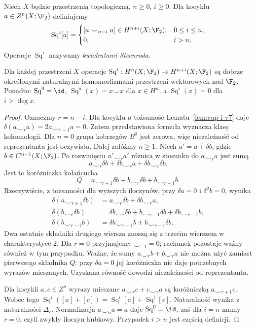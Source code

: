 \begin{definicja}
Niech $X$ będzie przestrzenią topologiczną,
$n\ge0$, $i\ge0$. Dla kocyklu
$a\in Z^n(X;\F_2)$ definiujemy
\[
\operatorname{Sq}^i[a]=
\begin{cases}
[a\smile_{n-i}a]\in H^{n+i}(X;\F_2),&0\le i\le n,\\
0,&i>n.
\end{cases}
\]
Operacje $\operatorname{Sq}^i$ nazywamy
\emph{kwadratami Steenroda}.
\end{definicja}

\begin{twierdzenie}
\label{thm:steenrod-basic-v7}
Dla każdej przestrzeni $X$ operacje
$\operatorname{Sq}^i:H^n(X;\F_2)\to H^{n+i}(X;\F_2)$
są dobrze określonymi naturalnymi homomorfizmami
przestrzeni wektorowych nad $\F_2$. Ponadto:
$\operatorname{Sq}^0=\id$,
$\operatorname{Sq}^n(x)=x\smile x$ dla $x\in H^n$,
a $\operatorname{Sq}^i(x)=0$ dla $i>\deg x$.
\end{twierdzenie}
\begin{proof}
Oznaczmy $r=n-i$. Dla kocyklu $a$ tożsamość
Lematu~\ref{lem:cup-i-v7} daje
$\delta(a\smile_r a)=2a\smile_{r-1}a=0$.
Zatem przedstawiona formuła wyznacza klasę
kohomologii. Dla $n=0$ grupa kobrzegów $B^0$ jest zerowa,
więc niezależność od reprezentanta jest oczywista.
Dalej załóżmy $n\ge1$. Niech $a'=a+\delta b$, gdzie
$b\in C^{n-1}(X;\F_2)$. Po rozwinięciu
$a'\smile_r a'$ różnica w stosunku do
$a\smile_r a$ jest sumą
\[
a\smile_r\delta b+\delta b\smile_r a
+\delta b\smile_r\delta b.
\]
Jest to koróżniczka kołańcucha
\[
Q=a\smile_{r+1}\delta b
  +b\smile_r\delta b+b\smile_{r-1}b.
\]
Rzeczywiście, z tożsamości dla wyższych iloczynów,
przy $\delta a=0$ i $\delta^2b=0$, wynika
\[
\begin{aligned}
\delta(a\smile_{r+1}\delta b)
 &=a\smile_r\delta b+\delta b\smile_r a,\\
\delta(b\smile_r\delta b)
 &=\delta b\smile_r\delta b
   +b\smile_{r-1}\delta b+\delta b\smile_{r-1}b,\\
\delta(b\smile_{r-1}b)
 &=\delta b\smile_{r-1}b+b\smile_{r-1}\delta b.
\end{aligned}
\]
Dwa ostatnie składniki drugiego wiersza znoszą się
z trzecim wierszem w charakterystyce $2$.
Dla $r=0$ przyjmujemy $\smile_{-1}=0$;
rachunek pozostaje ważny również w tym przypadku.
Ważne, że sumy $a\smile_r b+b\smile_r a$
nie można użyć zamiast pierwszego składnika $Q$:
przy $\delta a=0$ jej koróżniczka nie daje
potrzebnych wyrazów mieszanych.
Uzyskana równość dowodzi niezależności od reprezentanta.

Dla kocykli $a,c\in Z^n$ wyrazy mieszane
$a\smile_r c+c\smile_r a$ są koróżniczką
$a\smile_{r+1}c$. Wobec tego
$\operatorname{Sq}^i([a]+[c])=
\operatorname{Sq}^i[a]+\operatorname{Sq}^i[c]$.
Naturalność wynika z naturalności $\Delta_r$.
Normalizacja $a\smile_n a=a$ daje
$\operatorname{Sq}^0=\id$, zaś dla $i=n$
mamy $r=0$, czyli zwykły iloczyn kubkowy.
Przypadek $i>n$ jest częścią definicji.
\end{proof}


